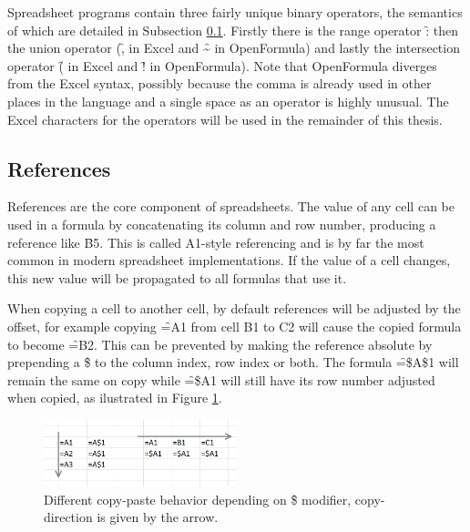 Spreadsheet programs contain three fairly unique binary operators, the semantics of which are detailed in Subsection \ref{sec:references}.
Firstly there is the range operator \f{:} then the union operator (\f{,} in Excel and \f{\textasciitilde} in OpenFormula) and lastly the intersection operator (\f{} in Excel and \f{!} in OpenFormula).
Note that OpenFormula diverges from the Excel syntax, possibly because the comma is already used in other places in the language and a single space as an operator is highly unusual.
The Excel characters for the operators will be used in the remainder of this thesis.

\subsection{References}
\label{sec:references}
References are the core component of spreadsheets.
The value of any cell can be used in a formula by concatenating its column and row number, producing a reference like \f{B5}.
This is called A1-style referencing and is by far the most common in modern spreadsheet implementations.
If the value of a cell changes, this new value will be propagated to all formulas that use it.

When copying a cell to another cell, by default references will be adjusted by the offset, for example copying \f{=A1} from cell B1 to C2 will cause the copied formula to become \f{=B2}.
This can be prevented by making the reference absolute by prepending a \f{\$} to the column index, row index or both.
The formula \f{=\$A\$1} will remain the same on copy while \f{=\$A1} will still have its row number adjusted when copied, as ilustrated in Figure \ref{fig:copy-modifiers}.

\begin{figure}
\centerfloat
\includegraphics[width=0.5\textwidth]{anatomy/copying}
\caption{Different copy-paste behavior depending on \f{\$} modifier, copy-direction is given by the arrow.}
\label{fig:copy-modifiers}
\end{figure}



